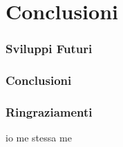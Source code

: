 \part{Conclusioni}


\section{Sviluppi Futuri}


\section{Conclusioni}


\section{Ringraziamenti}

io me stessa me